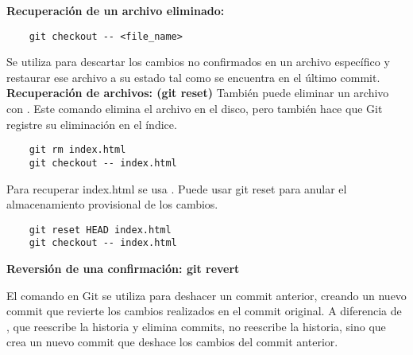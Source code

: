 \textbf{Recuperación de un archivo eliminado:}

\begin{verbatim}
    git checkout -- <file_name>
\end{verbatim}

Se utiliza para descartar los cambios no confirmados en un archivo específico y restaurar ese archivo a su estado tal como se encuentra en el último commit.\\ 


\textbf{Recuperación de archivos: (git reset)}
También puede eliminar un archivo con . Este comando elimina el archivo en el disco, pero también hace que Git registre su eliminación en el índice.

\begin{verbatim}
    git rm index.html
    git checkout -- index.html
\end{verbatim}

Para recuperar index.html se usa . Puede usar git reset para anular el almacenamiento provisional de los cambios.
\begin{verbatim}
    git reset HEAD index.html
    git checkout -- index.html
\end{verbatim}

\textbf{Reversión de una confirmación: git revert}

El comando  en Git se utiliza para deshacer un commit anterior, creando un nuevo commit que revierte los cambios realizados en el commit original. A diferencia de , que reescribe la historia y elimina commits,  no reescribe la historia, sino que crea un nuevo commit que deshace los cambios del commit anterior. 